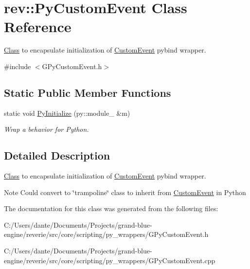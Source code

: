 \hypertarget{classrev_1_1_py_custom_event}{}\section{rev\+::Py\+Custom\+Event Class Reference}
\label{classrev_1_1_py_custom_event}


\mbox{\hyperlink{struct_class}{Class}} to encapsulate initialization of \mbox{\hyperlink{classrev_1_1_custom_event}{Custom\+Event}} pybind wrapper.  




{\ttfamily \#include $<$G\+Py\+Custom\+Event.\+h$>$}

\subsection*{Static Public Member Functions}
\begin{DoxyCompactItemize}
\item 
\mbox{\label{classrev_1_1_py_custom_event_a8cb032d84319e7261252b0a50fe5cc24}} 
static void \mbox{\hyperlink{classrev_1_1_py_custom_event_a8cb032d84319e7261252b0a50fe5cc24}{Py\+Initialize}} (py\+::module\+\_\+ \&m)
\begin{DoxyCompactList}\small\item\em Wrap a behavior for Python. \end{DoxyCompactList}\end{DoxyCompactItemize}


\subsection{Detailed Description}
\mbox{\hyperlink{struct_class}{Class}} to encapsulate initialization of \mbox{\hyperlink{classrev_1_1_custom_event}{Custom\+Event}} pybind wrapper. 

\begin{DoxyNote}{Note}
Could convert to \char`\"{}trampoline\char`\"{} class to inherit from \mbox{\hyperlink{classrev_1_1_custom_event}{Custom\+Event}} in Python 
\end{DoxyNote}


The documentation for this class was generated from the following files\+:\begin{DoxyCompactItemize}
\item 
C\+:/\+Users/dante/\+Documents/\+Projects/grand-\/blue-\/engine/reverie/src/core/scripting/py\+\_\+wrappers/G\+Py\+Custom\+Event.\+h\item 
C\+:/\+Users/dante/\+Documents/\+Projects/grand-\/blue-\/engine/reverie/src/core/scripting/py\+\_\+wrappers/G\+Py\+Custom\+Event.\+cpp\end{DoxyCompactItemize}
